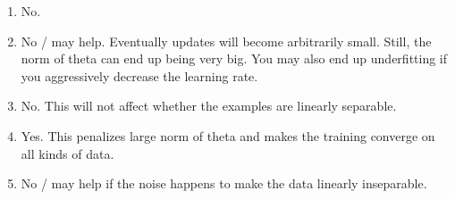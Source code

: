 \begin{answer}
  \begin{enumerate}[label=\roman*.]
    \item No.
    \item No / may help. Eventually updates will become arbitrarily small.
    Still, the norm of theta can end up being very big. You may also end up
    underfitting if you aggressively decrease the learning rate.
    \item No. This will not affect whether the examples are linearly
    separable.
    \item Yes. This penalizes large norm of theta and makes the training
    converge on all kinds of data.
    \item No / may help if the noise happens to make the data linearly
    inseparable.
  \end{enumerate}
\end{answer}

